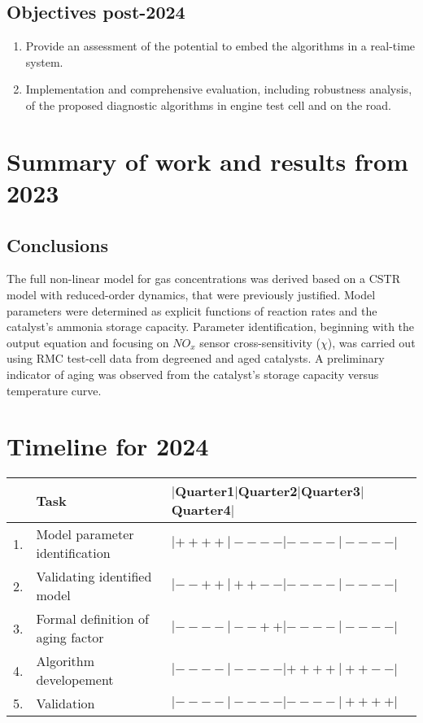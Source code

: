 \documentclass[letterpaper, 11pt]{article}
\begin{document}
\subsection{Objectives post-2024}
\begin{enumerate}
    \item Provide an assessment of the potential to embed the algorithms in a real-time system.
    \item Implementation and comprehensive evaluation, including robustness analysis, of the proposed diagnostic algorithms in engine test cell and on the road.
\end{enumerate}



\section{Summary of work and results from 2023}




\subsection{Conclusions}
The full non-linear model for gas concentrations was derived based on a CSTR
model with reduced-order dynamics, that were previously justified. Model
parameters were determined as explicit functions of reaction rates and the
catalyst's ammonia storage capacity.  Parameter identification, beginning with
the output equation and focusing on $NO_x$ sensor cross-sensitivity ($\chi$),
was carried out using RMC test-cell data from degreened and aged catalysts. A
preliminary indicator of aging was observed from the catalyst's storage capacity
versus temperature curve.


\section{Timeline for 2024}

\begin{table}[H]
    \centering
    \begin{tabular}{l l l}
        \hline\hline
                & Task & $|$Quarter1$|$Quarter2$|$Quarter3$|$Quarter4$|$ \\\hline\hline
        1.      & Model parameter identification   & $|++++|----|----|----|$\\
        2.      & Validating identified model      & $|--++|++--|----|----|$\\
        3.      & Formal definition of aging factor& $|----|--++|----|----|$\\
        4.      & Algorithm developement           & $|----|----|++++|++--|$\\
        5.      & Validation                       & $|----|----|----|++++|$\\
        \hline\hline
    \end{tabular}
\end{table}
\end{document}
